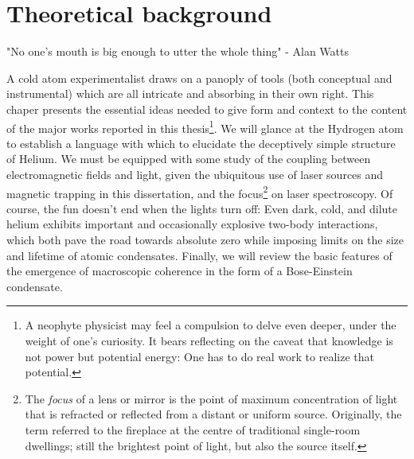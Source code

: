 







\chapter{Theoretical background}

"No one's mouth is big enough to utter the whole thing" - Alan Watts

	{A} cold atom experimentalist draws on a panoply of tools (both conceptual and instrumental) which are all intricate and absorbing in their own right. This chaper presents the essential ideas needed to give form and context to the content of the major works reported in this thesis\footnote{A neophyte physicist may feel a compulsion to delve even deeper, under the weight of one's curiosity. It bears reflecting on the caveat that knowledge is not power but potential energy: One has to do real work to realize that potential.}. 
	We will glance at the Hydrogen atom to establish a language with which to elucidate the deceptively simple structure of Helium.  We must be equipped with some study of the coupling between electromagnetic fields and light, given the ubiquitous use of laser sources and magnetic trapping in this dissertation, and the focus\footnote{The \emph{focus} of a lens or mirror is the point of maximum concentration of light that is refracted or reflected from a distant or uniform source. Originally, the term referred to the fireplace at the centre of traditional single-room dwellings; still the brightest point of light, but also the source itself.} on laser spectroscopy. Of course, the fun doesn't end when the lights turn off: Even dark, cold, and dilute helium exhibits important and occasionally explosive two-body interactions, which both pave the road towards absolute zero while imposing limits on the size and lifetime of atomic condensates. Finally, we will review the basic features of the emergence of macroscopic coherence in the form of a Bose-Einstein condensate. 

